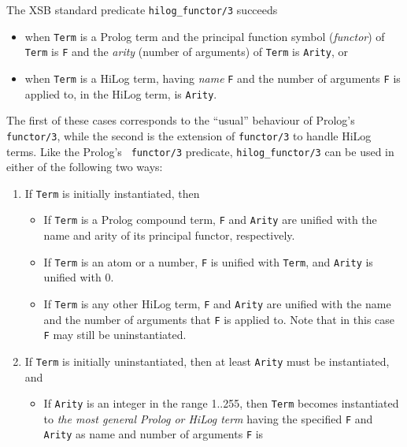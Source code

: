 \begin{description}
    The XSB standard predicate {\tt hilog\_functor/3} succeeds 
    \begin{itemize}
    \item when {\tt Term} is a Prolog term and the principal function 
          symbol ({\em functor}) of {\tt Term} is {\tt F} and the
          {\em arity} (number of arguments) of {\tt Term} is 
          {\tt Arity}, or
    \item when {\tt Term} is a HiLog term, having {\em name} {\tt F} 
          and the number of arguments {\tt F} is applied to, in the 
          HiLog term, is {\tt Arity}.
    \end{itemize}
    The first of these cases corresponds to the ``usual'' behaviour of
    Prolog's {\tt functor/3}, while the second is the extension of
    {\tt functor/3} to handle HiLog terms. Like the Prolog's {\tt
    functor/3} predicate, {\tt hilog\_functor/3} can be used in either
    of the following two ways:
    \begin{enumerate}
    \item If {\tt Term} is initially instantiated, then
          \begin{itemize}
          \item If {\tt Term} is a Prolog compound term, {\tt F} and 
                {\tt Arity} are unified with the name and arity of 
                its principal functor, respectively.
          \item If {\tt Term} is an atom or a number, {\tt F} is unified 
                with {\tt Term}, and {\tt Arity} is unified with 0.
          \item If {\tt Term} is any other HiLog term, {\tt F} and {\tt Arity} 
                are unified with the name and the number of arguments 
                that {\tt F} is applied to. Note that in this case {\tt F}
                may still be uninstantiated.
          \end{itemize}
    \item If {\tt Term} is initially uninstantiated, then at least
          {\tt Arity} must be instantiated, and
          \begin{itemize}
          \item If {\tt Arity} is an integer in the range 1..255, then
                {\tt Term} becomes instantiated to {\em the most general 
                Prolog or HiLog term} having the specified {\tt F} and 
                {\tt Arity} as name and number of arguments {\tt F} is 

\end{itemize}
\end{enumerate}
\end{description}
